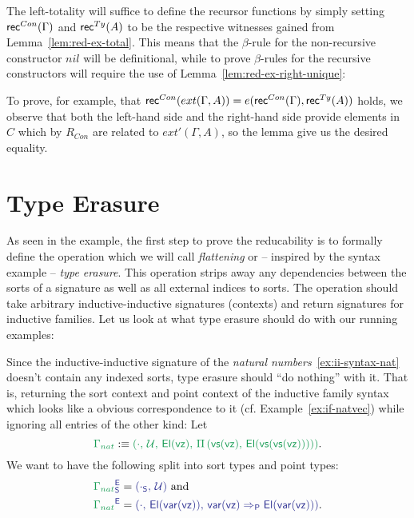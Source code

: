 The left-totality will suffice to define the recursor functions by simply setting
$\mathsf{rec}^{Con}(\Gamma)$ and $\mathsf{rec}^{Ty}(A)$ to be the respective witnesses gained from
Lemma~\ref{lem:red-ex-total}.
This means that the $\beta$-rule for the non-recursive constructor $nil$ will be
definitional, while to prove $\beta$-rules for the recursive constructors will
require the use of Lemma~\ref{lem:red-ex-right-unique}:

To prove, for example, that $\mathsf{rec}^{Con}(ext(\Gamma, A))
= e(\mathsf{rec}^{Con}(\Gamma), \mathsf{rec}^{Ty}(A))$ holds, we observe that both the left-hand side
and the right-hand side provide elements in $C$ which by $R_{Con}$ are related
to $ext'(\Gamma, A)$, so the lemma give us the desired equality.

\section{Type Erasure}\label{sec:red-e}

As seen in the example, the first step to prove the reducability is to formally
define the operation which we will call \emph{flattening} or -- inspired by
the syntax example -- \emph{type erasure}.
This operation strips away any dependencies between the sorts of a signature
as well as all external indices to sorts.
The operation should take arbitrary inductive-inductive signatures (contexts) and
return signatures for inductive families.
Let us look at what type erasure should do with our running examples:

\begin{example}\label{ex:red-e-nat}
Since the inductive-inductive signature of the \emph{natural numbers}~\ref{ex:ii-syntax-nat} doesn't
contain any indexed sorts, type erasure should ``do nothing'' with it.
That is, returning the sort context and point context of the inductive family
syntax which looks like a obvious correspondence to it (cf. Example~\ref{ex:if-natvec})
while ignoring all entries of the other kind:
Let
\begin{equation*}
\grm{\Gamma_{nat}} 
  :\equiv \grm{(\cdot,\, \UU,\, \El(\vz),\, \Pi\left(\vs(\vz),\, \El(\vs(\vs(\vz)))\right))}
  \text{.}
\end{equation*}
We want to have the following split into sort types and point types:
\begin{align*}
\tqm{\grm{\Gamma_{nat}}^\EE_\Sc}
 &= \tqm{(\cdot_\Sc,\, \UU)} \text{ and} \\
\tqm{\grm{\Gamma_{nat}}^\EE}
 &= \tqm{(\cdot,\, \El(\var(\vz)),\, \var(\vz) \Rightarrow_\Pc \El(\var(\vz)))} \text{.}
\end{align*}
\end{example}

